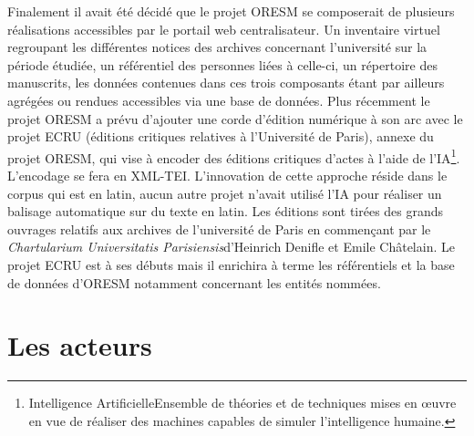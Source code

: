 Finalement il avait été décidé que le projet ORESM se composerait de plusieurs réalisations accessibles par le portail web centralisateur. Un inventaire virtuel regroupant les différentes notices des archives concernant l'université sur la période étudiée, un référentiel des personnes liées à celle-ci, un répertoire des manuscrits, les données contenues dans ces trois composants étant par ailleurs agrégées ou rendues accessibles via une base de données. Plus récemment le projet ORESM a prévu d'ajouter une corde d'édition numérique à son arc avec le projet ECRU (éditions critiques relatives à l’Université de Paris), annexe du projet ORESM, qui vise à encoder des éditions critiques d'actes à l'aide de l'IA\footnote{\og Intelligence Artificielle\fg  Ensemble de théories et de techniques mises en œuvre en vue de réaliser des machines capables de simuler l'intelligence humaine.}. L'encodage se fera en XML-TEI. L'innovation de cette approche réside dans le corpus qui est en latin, aucun autre projet n'avait utilisé l'IA pour réaliser un balisage automatique sur du texte en latin. Les éditions sont tirées des grands ouvrages relatifs aux archives de l'université de Paris en commençant par le \og \textit{Chartularium Universitatis Parisiensis}\fg d’Heinrich Denifle et Emile Châtelain. Le projet ECRU est à ses débuts mais il enrichira à terme les référentiels et la base de données d'ORESM notamment concernant les entités nommées.
\section{Les acteurs}
